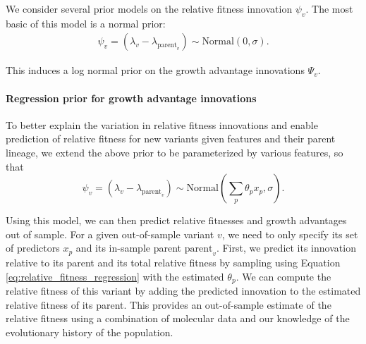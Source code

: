 We consider several prior models on the relative fitness innovation $\psi_{v}$.
The most basic of this model is a normal prior:
\begin{align*}
    \psi_{v} = (\lambda_{v} - \lambda_{\text{parent}_{v}}) \sim \text{Normal}(0, \sigma).
\end{align*}

This induces a log normal prior on the growth advantage innovations $\Psi_{v}$.

\paragraph{Regression prior for growth advantage innovations}%

To better explain the variation in relative fitness innovations and enable prediction of relative fitness for new variants given features and their parent lineage, we extend the above prior to be parameterized by various features, so that
\begin{equation}\label{eq:relative_fitness_regression}
    \psi_{v} = (\lambda_{v} - \lambda_{\text{parent}_{v}}) \sim \text{Normal} \left( \sum_{p} \theta_{p} x_{p}, \sigma \right).
\end{equation}

Using this model, we can then predict relative fitnesses and growth advantages out of sample.
For a given out-of-sample variant $v$, we need to only specify its set of predictors $x_{p}$ and its in-sample parent $\text{parent}_v$.
First, we predict its innovation relative to its parent and its total relative fitness by sampling using Equation \ref{eq:relative_fitness_regression} with the estimated $\theta_{p}$.
We can compute the relative fitness of this variant by adding the predicted innovation to the estimated relative fitness of its parent.
This provides an out-of-sample estimate of the relative fitness using a combination of molecular data and our knowledge of the evolutionary history of the population.

%

